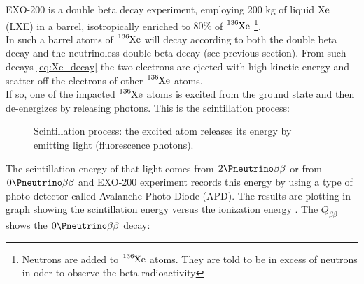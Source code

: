 \documentclass[a4paper, 11pt]{report}%
\begin{document}
  EXO-200 is a double beta decay experiment, employing 200 kg of liquid $\ce{Xe}$ (LXE) in a barrel, isotropically enriched to  $80\%$ 
  of $\ce{^{136}Xe}$ \footnote{Neutrons are added to $\ce{^{136}Xe}$ atoms. They are told to be in excess of neutrons in oder to observe the 
  beta radioactivity}.\\
  In such a barrel atoms of $\ce{^{136}Xe}$ will decay according to both the double beta decay and  
  the neutrinoless double beta decay (see previous section). 
  From such decays \ref{eq:Xe_decay} the two electrons are ejected with high kinetic energy and scatter off the electrons of other 
  $\ce{^{136}Xe}$ atoms.\\
  If so, one of the impacted $\ce{^{136}Xe}$ atoms is excited from the ground state and then de-energizes by releasing photons. 
  This is the scintillation process: 
  
  \newpage 
  
  \begin{figure}[!hbtp]
    \centering
    \caption{Scintillation process: the excited atom releases its energy by emitting light (fluorescence photons).}
    \label{fig:scintillation}
  \end{figure}
  
  The scintillation energy of that light comes from \(2\Pneutrino\beta\beta\) or from \(0\Pneutrino\beta\beta\) and 
  EXO-200 experiment records this energy by using a type of photo-detector called Avalanche Photo-Diode (APD). 
  The results are plotting in graph showing 
  the scintillation energy versus the ionization energy \cite{ref:motivation_and_introduction}. The $Q_{\beta\beta}$ shows 
  the \(0\Pneutrino\beta\beta\) decay:
  
\end{document}
